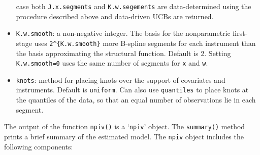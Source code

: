 \documentclass[
]{jss}
\begin{document}
\begin{itemize}
  case both \texttt{J.x.segments} and \texttt{K.w.segements} are
  data-determined using the procedure described above and data-driven
  UCBs are returned.
\item
  \texttt{K.w.smooth}: a non-negative integer. The basis for the
  nonparametric first-stage uses \texttt{2\^{}\{K.w.smooth\}} more
  B-spline segments for each instrument than the basis approximating the
  structural function. Default is 2. Setting \texttt{K.w.smooth=0} uses
  the same number of segments for \texttt{x} and \texttt{w}.
\item
  \texttt{knots}: method for placing knots over the support of
  covariates and instruments. Default is \texttt{uniform}. Can also use
  \texttt{quantiles} to place knots at the quantiles of the data, so
  that an equal number of observations lie in each segment.
\end{itemize}

The output of the function \texttt{npiv()} is a `\texttt{npiv}' object.
The \texttt{summary()} method prints a brief summary of the estimated
model. The \texttt{npiv} object includes the following components:
\end{document}

